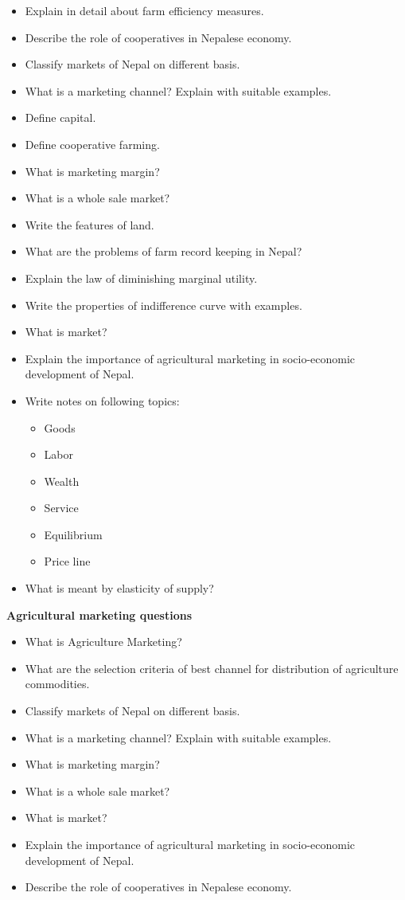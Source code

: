 \documentclass[11pt,]{book}
\providecommand{\tightlist}{%
  \setlength{\itemsep}{0pt}\setlength{\parskip}{0pt}}
\theoremstyle{definition}
\theoremstyle{definition}
\theoremstyle{definition}
\theoremstyle{remark}
\begin{document}
\begin{itemize}
\item
  Explain in detail about farm efficiency measures.
\item
  Describe the role of cooperatives in Nepalese economy.
\item
  Classify markets of Nepal on different basis.
\item
  What is a marketing channel? Explain with suitable examples.
\item
  Define capital.
\item
  Define cooperative farming.
\item
  What is marketing margin?
\item
  What is a whole sale market?
\item
  Write the features of land.
\item
  What are the problems of farm record keeping in Nepal?
\item
  Explain the law of diminishing marginal utility.
\item
  Write the properties of indifference curve with examples.
\item
  What is market?
\item
  Explain the importance of agricultural marketing in socio-economic
  development of Nepal.
\item
  Write notes on following topics:

  \begin{itemize}
  \tightlist
  \item
    Goods
  \item
    Labor
  \item
    Wealth
  \item
    Service
  \item
    Equilibrium
  \item
    Price line
  \end{itemize}
\item
  What is meant by elasticity of supply?
\end{itemize}

\textbf{Agricultural marketing questions}

\begin{itemize}
\tightlist
\item
  What is Agriculture Marketing?
\item
  What are the selection criteria of best channel for distribution of
  agriculture commodities.
\item
  Classify markets of Nepal on different basis.
\item
  What is a marketing channel? Explain with suitable examples.
\item
  What is marketing margin?
\item
  What is a whole sale market?
\item
  What is market?
\item
  Explain the importance of agricultural marketing in socio-economic
  development of Nepal.
\item
  Describe the role of cooperatives in Nepalese economy.
\end{itemize}
\end{document}
